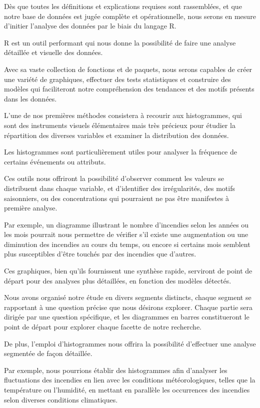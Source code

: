 \documentclass[
]{article}
\begin{document}
Dès que toutes les définitions et explications requises sont
rassemblées, et que notre base de données est jugée complète et
opérationnelle, nous serons en mesure d'initier l'analyse des données
par le biais du langage R.

R est un outil performant qui nous donne la possibilité de faire une
analyse détaillée et visuelle des données.

Avec sa vaste collection de fonctions et de paquets, nous serons
capables de créer une variété de graphiques, effectuer des tests
statistiques et construire des modèles qui faciliteront notre
compréhension des tendances et des motifs présents dans les données.

L'une de nos premières méthodes consistera à recourir aux histogrammes,
qui sont des instruments visuels élémentaires mais très précieux pour
étudier la répartition des diverses variables et examiner la
distribution des données.

Les histogrammes sont particulièrement utiles pour analyser la fréquence
de certains événements ou attributs.

Ces outils nous offriront la possibilité d'observer comment les valeurs
se distribuent dans chaque variable, et d'identifier des irrégularités,
des motifs saisonniers, ou des concentrations qui pourraient ne pas être
manifestes à première analyse.

Par exemple, un diagramme illustrant le nombre d'incendies selon les
années ou les mois pourrait nous permettre de vérifier s'il existe une
augmentation ou une diminution des incendies au cours du temps, ou
encore si certains mois semblent plus susceptibles d'être touchés par
des incendies que d'autres.

Ces graphiques, bien qu'ils fournissent une synthèse rapide, serviront
de point de départ pour des analyses plus détaillées, en fonction des
modèles détectés.

Nous avons organisé notre étude en divers segments distincts, chaque
segment se rapportant à une question précise que nous désirons explorer.
Chaque partie sera dirigée par une question spécifique, et les
diagrammes en barres constitueront le point de départ pour explorer
chaque facette de notre recherche.

De plus, l'emploi d'histogrammes nous offrira la possibilité d'effectuer
une analyse segmentée de façon détaillée.

Par exemple, nous pourrions établir des histogrammes afin d'analyser les
fluctuations des incendies en lien avec les conditions météorologiques,
telles que la température ou l'humidité, en mettant en parallèle les
occurrences des incendies selon diverses conditions climatiques.
\end{document}

